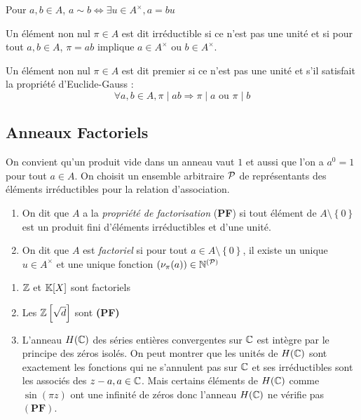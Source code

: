 \documentclass{cours}
\begin{document}
\begin{lemma}
    Pour $a, b \in A$, $a \sim b \Leftrightarrow \exists u \in A^{\times}, a = bu$
\end{lemma}

\begin{definition}
    Un élément non nul $\pi \in A$ est dit irréductible si ce n'est pas une unité et si pour tout $a, b \in A$, $\pi = ab$ implique $a \in A^{\times}$ ou $b\in A^{\times}$.
\end{definition}

\begin{definition}
    Un élément non nul $\pi \in A$ est dit premier si ce n'est pas une unité et s'il satisfait la propriété d'Euclide-Gauss :
    \[
        \forall a,b \in A, \pi \mid ab \Longrightarrow \pi \mid a \text{ ou } \pi \mid b
    \]
\end{definition}

\subsection{Anneaux Factoriels}
\begin{definition}
    On convient qu'un produit vide dans un anneau vaut $1$ et aussi que l'on a $a^{0} = 1$ pour tout $a \in A$. On choisit un ensemble arbitraire $\mathcal{P}$ de représentants des éléments irréductibles pour la relation d'association.
\end{definition}

\begin{definition}
    \begin{enumerate}
        \item On dit que $A$ a la \emph{propriété de factorisation} (\textbf{PF}) si tout élément de $A\setminus \left\{0\right\}$ est un produit fini d'éléments irréductibles et d'une unité.
        \item On dit que $A$ est \emph{factoriel} si pour tout $a \in A\setminus \left\{0\right\}$, il existe un unique $u \in A^{\times}$ et une unique fonction $\left(\nu_{\pi}(a)\right) \in \mathbb{N}^{\left(\mathcal{P}\right)}$
    \end{enumerate}
\end{definition}

\begin{example}
    \begin{enumerate}
        \item $\mathbb{Z}$ et $\mathbb{K}[X]$ sont factoriels
        \item Les $\mathbb{Z}\left[\sqrt{d}\right]$ sont \textbf{(PF)}
        \item L'anneau $H(\mathbb{C})$ des séries entières convergentes sur $\mathbb{C}$ est intègre par le principe des zéros isolés. On peut montrer que les unités de $H(\mathbb{C})$ sont exactement les fonctions qui ne s'annulent pas sur $\mathbb{C}$ et ses irréductibles sont les associés des $z - a, a\in \mathbb{C}$. Mais certains éléments de $H(\mathbb{C})$ comme $\sin\left(\pi z\right)$ ont une infinité de zéros donc l'anneau $H(\mathbb{C})$ ne vérifie pas $\left(\textbf{PF}\right)$.
    \end{enumerate}
\end{example}
\end{document}
